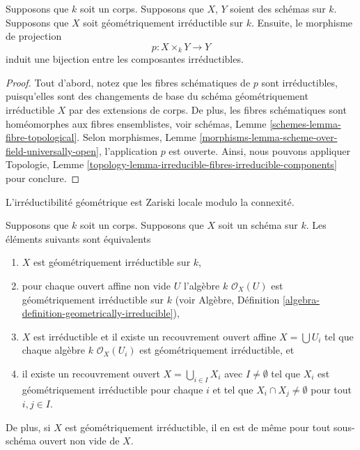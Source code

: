 \begin{lemma}
\label{lemma-bijection-irreducible-components}
Supposons que $k$ soit un corps. Supposons
que $X$, $Y$ soient des schémas sur $k$.
Supposons que $X$ soit géométriquement
irréductible sur $k$. Ensuite, le morphisme de projection
$$
p : X \times_k Y \longrightarrow Y
$$
induit une bijection entre les composantes irréductibles.
\end{lemma}

\begin{proof}
Tout d'abord, notez que les fibres schématiques de $p$
sont irréductibles, puisqu'elles sont des changements de
base du schéma géométriquement irréductible $X$ par des
extensions de corps. De plus, les fibres schématiques
sont homéomorphes aux fibres ensemblistes, voir schémas,
Lemme \ref{schemes-lemma-fibre-topological}. Selon
morphismes, Lemme
\ref{morphisms-lemma-scheme-over-field-universally-open}, l'application
$p$ est ouverte. Ainsi, nous pouvons appliquer Topologie, Lemme
\ref{topology-lemma-irreducible-fibres-irreducible-components} pour conclure.
\end{proof}

\begin{lemma}
\label{lemma-geometrically-irreducible-local}
\begin{slogan}
L'irréductibilité géométrique est Zariski locale modulo la connexité.
\end{slogan}
Supposons que $k$ soit un corps. Supposons que $X$ soit
un schéma sur $k$. Les éléments suivants sont équivalents
\begin{enumerate}
\item $X$ est géométriquement irréductible sur $k$, \item
pour chaque ouvert affine non vide $U$ l'algèbre $k$
$\mathcal{O}_X(U)$ est géométriquement irréductible sur $k$
(voir Algèbre, Définition
\ref{algebra-definition-geometrically-irreducible}), \item $X$
est irréductible et il existe un recouvrement ouvert affine $X =
\bigcup U_i$ tel que chaque algèbre $k$ $\mathcal{O}_X(U_i)$ est
géométriquement irréductible, et \item il existe un recouvrement
ouvert $X = \bigcup_{i \in I} X_i$ avec $I \not = \emptyset$
tel que $X_i$ est géométriquement irréductible pour chaque $i$ et
tel que $X_i \cap X_j \not = \emptyset$ pour tout $i, j \in I$.
\end{enumerate}
De plus, si $X$ est géométriquement irréductible, il en
est de même pour tout sous-schéma ouvert non vide de $X$.
\end{lemma}

